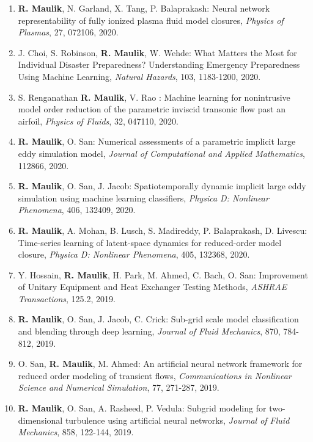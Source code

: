\documentclass[letterpaper]{article}
\begin{document}
\begin{enumerate}
\item \textbf{R. Maulik}, N. Garland, X. Tang, P. Balaprakash: Neural network representability of fully ionized plasma fluid model closures, {\it Physics of Plasmas}, 27, 072106, 2020.

\item J. Choi, S. Robinson, \textbf{R. Maulik}, W. Wehde: What Matters the Most for Individual Disaster Preparedness? Understanding Emergency Preparedness Using Machine Learning, {\it Natural Hazards}, 103, 1183-1200, 2020. 

\item S. Renganathan \textbf{R. Maulik}, V. Rao : Machine learning for nonintrusive model order reduction of the parametric inviscid transonic flow past an airfoil, {\it Physics of Fluids}, 32, 047110, 2020. 

\item \textbf{R. Maulik}, O. San: Numerical assessments of a parametric implicit large eddy simulation model, {\it Journal of Computational and Applied Mathematics}, 112866, 2020.

\item \textbf{R. Maulik}, O. San, J. Jacob: Spatiotemporally dynamic implicit large eddy simulation using machine learning classifiers, {\it Physica D: Nonlinear Phenomena}, 406, 132409, 2020. 

\item \textbf{R. Maulik}, A. Mohan, B. Lusch, S. Madireddy, P. Balaprakash, D. Livescu: Time-series learning of latent-space dynamics for reduced-order model closure, {\it Physica D: Nonlinear Phenomena}, 405, 132368, 2020. 

\item Y. Hossain, \textbf{R. Maulik}, H. Park, M. Ahmed, C. Bach, O. San: Improvement of Unitary Equipment and Heat Exchanger Testing Methods, {\it ASHRAE Transactions}, 125.2, 2019. 

\item \textbf{R. Maulik}, O. San, J. Jacob, C. Crick: Sub-grid scale model classification and blending through deep learning, {\it Journal of Fluid Mechanics}, 870, 784-812, 2019. 

\item O. San, \textbf{R. Maulik}, M. Ahmed: An artificial neural network framework for reduced order modeling of transient flows, {\it Communications in Nonlinear Science and Numerical Simulation}, 77, 271-287, 2019. 

\item \textbf{R. Maulik}, O. San, A. Rasheed, P. Vedula: Subgrid modeling for two-dimensional turbulence using artificial neural networks, {\it Journal of Fluid Mechanics}, 858, 122-144, 2019. 


\end{enumerate}
\end{document}
